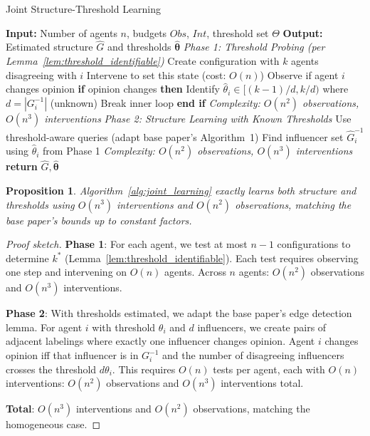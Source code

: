 \documentclass[11pt]{article}
\newtheorem{proposition}{Proposition}
\begin{document}
\begin{algorithm}[t]
\caption{Joint Structure-Threshold Learning}
\label{alg:joint_learning}
\begin{algorithmic}[1]
\State \textbf{Input:} Number of agents $n$, budgets $Obs$, $Int$, threshold set $\Theta$
\State \textbf{Output:} Estimated structure $\hat{G}$ and thresholds $\hat{\boldsymbol{\theta}}$
\State 
\State \textit{Phase 1: Threshold Probing (per Lemma~\ref{lem:threshold_identifiable})}
        \State Create configuration with $k$ agents disagreeing with $i$
        \State Intervene to set this state (cost: $O(n)$)
        \State Observe if agent $i$ changes opinion
        \State \textbf{if} opinion changes \textbf{then}
            \State \quad Identify $\hat{\theta}_i \in [(k-1)/d, k/d)$ where $d = |G_i^{-1}|$ (unknown)
            \State \quad Break inner loop
        \State \textbf{end if}
    \EndFor
\EndFor
\State \textit{Complexity: $O(n^2)$ observations, $O(n^3)$ interventions}
\State
\State \textit{Phase 2: Structure Learning with Known Thresholds}
    \State Use threshold-aware queries (adapt base paper's Algorithm~1)
    \State Find influencer set $\hat{G}_i^{-1}$ using $\hat{\theta}_i$ from Phase 1
\EndFor
\State \textit{Complexity: $O(n^2)$ observations, $O(n^3)$ interventions}
\State
\State \textbf{return} $\hat{G}, \hat{\boldsymbol{\theta}}$
\end{algorithmic}
\end{algorithm}

\begin{proposition}
Algorithm~\ref{alg:joint_learning} exactly learns both structure and thresholds using $O(n^3)$ interventions and $O(n^2)$ observations, matching the base paper's bounds up to constant factors.
\end{proposition}

\begin{proof}[Proof sketch]
\textbf{Phase 1}: For each agent, we test at most $n-1$ configurations to determine $k^*$ (Lemma~\ref{lem:threshold_identifiable}). Each test requires observing one step and intervening on $O(n)$ agents. Across $n$ agents: $O(n^2)$ observations and $O(n^3)$ interventions.

\textbf{Phase 2}: With thresholds estimated, we adapt the base paper's edge detection lemma. For agent $i$ with threshold $\theta_i$ and $d$ influencers, we create pairs of adjacent labelings where exactly one influencer changes opinion. Agent $i$ changes opinion iff that influencer is in $G_i^{-1}$ and the number of disagreeing influencers crosses the threshold $d \theta_i$. This requires $O(n)$ tests per agent, each with $O(n)$ interventions: $O(n^2)$ observations and $O(n^3)$ interventions total.

\textbf{Total}: $O(n^3)$ interventions and $O(n^2)$ observations, matching the homogeneous case.
\end{proof}
\end{document}

